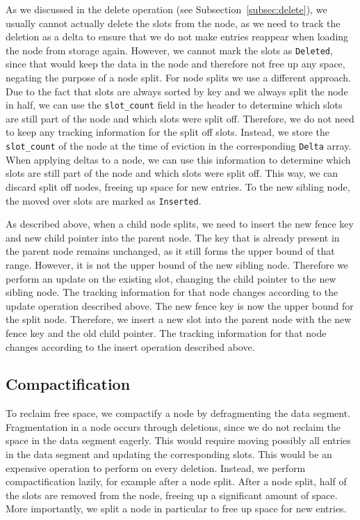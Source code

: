 As we discussed in the delete operation (see Subsection~\ref{subsec:delete}), we usually cannot actually delete the slots from the node, as we need to track the deletion as a delta to ensure that we do not make entries reappear when loading the node from storage again.
However, we cannot mark the slots as \texttt{Deleted}, since that would keep the data in the node and therefore not free up any space, negating the purpose of a node split.
For node splits we use a different approach.
Due to the fact that slots are always sorted by key and we always split the node in half, we can use the \texttt{slot\_count} field in the header to determine which slots are still part of the node and which slots were split off.
Therefore, we do not need to keep any tracking information for the split off slots.
Instead, we store the \texttt{slot\_count} of the node at the time of eviction in the corresponding \texttt{Delta} array.
When applying deltas to a node, we can use this information to determine which slots are still part of the node and which slots were split off.
This way, we can discard split off nodes, freeing up space for new entries.
To the new sibling node, the moved over slots are marked as \texttt{Inserted}.

As described above, when a child node splits, we need to insert the new fence key and new child pointer into the parent node.
The key that is already present in the parent node remains unchanged, as it still forms the upper bound of that range.
However, it is not the upper bound of the new sibling node. Therefore we perform an update on the existing slot, changing the child pointer to the new sibling node.
The tracking information for that node changes according to the update operation described above.
The new fence key is now the upper bound for the split node. 
Therefore, we insert a new slot into the parent node with the new fence key and the old child pointer.
The tracking information for that node changes according to the insert operation described above.

\subsection*{Compactification}
To reclaim free space, we compactify a node by defragmenting the data segment.
Fragmentation in a node occurs through deletions, since we do not reclaim the space in the data segment eagerly.
This would require moving possibly all entries in the data segment and updating the corresponding slots.
This would be an expensive operation to perform on every deletion.
Instead, we perform compactification lazily, for example after a node split.
After a node split, half of the slots are removed from the node, freeing up a significant amount of space.
More importantly, we split a node in particular to free up space for new entries.

